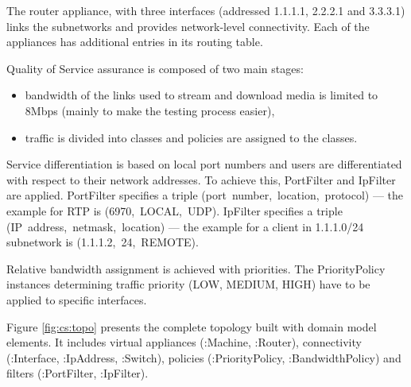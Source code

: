 \documentclass[11pt]{book}
\begin{document}
        The router appliance, with three interfaces (addressed 1.1.1.1, 2.2.2.1 and 3.3.3.1) links the subnetworks and
        provides network-level connectivity. Each of the appliances has additional entries in its routing table.

        Quality of Service assurance is composed of two main stages:

        \begin{itemize}
          \item bandwidth of the links used to stream and download media is limited to 8Mbps (mainly to make the
                testing process easier),
          \item traffic is divided into classes and policies are assigned to the classes.
        \end{itemize}

        Service differentiation is based on local port numbers and users are differentiated with respect to their
        network addresses. To achieve this, PortFilter and IpFilter are applied. PortFilter specifies a triple
        \mbox{(port number, location, protocol)} --- the example for RTP is \mbox{(6970, LOCAL, UDP)}. IpFilter
        specifies a triple \mbox{(IP address, netmask, location)} --- the example for a client in 1.1.1.0/24 subnetwork
        is \mbox{(1.1.1.2, 24, REMOTE)}.

        Relative bandwidth assignment is achieved with priorities. The PriorityPolicy instances determining traffic
        priority (LOW, MEDIUM, HIGH) have to be applied to specific interfaces.

        Figure \ref{fig:cs:topo} presents the complete topology built with domain model elements. It includes virtual
        appliances (:Machine, :Router), connectivity (:Interface, :IpAddress, :Switch), policies (:PriorityPolicy,
        :BandwidthPolicy) and filters (:PortFilter, :IpFilter).
\end{document}
